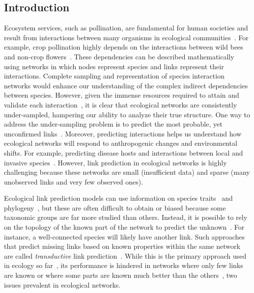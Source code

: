 \documentclass[oneside, a4paper, onecolumn, 11pt]{article}
\begin{document}
\begin{refsection}

\clearpage

\section*{Introduction}

Ecosystem services, such as pollination, are fundamental for human societies and result from interactions between many organisms in ecological communities~\autocite{Windsor2022-ch}. For example, crop pollination highly depends on the interactions between wild bees and non-crop flowers~\autocite{Magrach2018-me}. These dependencies can be described mathematically using networks in which nodes represent species and links represent their interactions. 
Complete sampling and representation of species interaction networks would enhance our understanding of the complex indirect dependencies between species. However, given the immense resources required to attain and validate each interaction~\autocite{Falcao2016-vq,Jordano2016-jy,Dallas2017-lu}, it is clear that ecological networks are consistently under-sampled, hampering our ability to analyze their true structure. One way to address the under-sampling problem is to predict the most probable, yet unconfirmed links~\autocite{Rohr2016-kv,Desjardins-Proulx2017-ba,Terry2020-wv,Pichler2020-bg,Stock2021-mf,Strydom2021-aq,Benadi2022-yv}. Moreover, predicting interactions helps us understand how ecological networks will respond to anthropogenic changes and environmental shifts. For example, predicting disease hosts and interactions between local and invasive species~\autocite{Strydom2021-aq}. However, link prediction in ecological networks is highly challenging because these networks are small (insufficient data) and sparse (many unobserved links and very few observed ones). 

Ecological link prediction models can use information on species traits~\autocite{Pichler2020-bg,Caron2024-jf} and phylogeny~\autocite{Benadi2022-yv}, but these are often difficult to obtain or biased because some taxonomic groups are far more studied than others. Instead, it is possible to rely on the topology of the known part of the network to predict the unknown~\autocite{Desjardins-Proulx2017-ba,Terry2020-wv}. For instance, a well-connected species will likely have another link. Such approaches that predict missing links based on known properties within the same network are called \textit{transductive} link prediction~\autocite{Ahmadi2023-gn}. While this is the primary approach used in ecology so far~\autocite{Desjardins-Proulx2017-ba,Terry2020-wv}, its performance is hindered in networks where only few links are known or where some parts are known much better than the others~\autocite{Fire2013-aa,Galkin2022-il}, two issues prevalent in ecological networks. 


\end{refsection}
\end{document}
